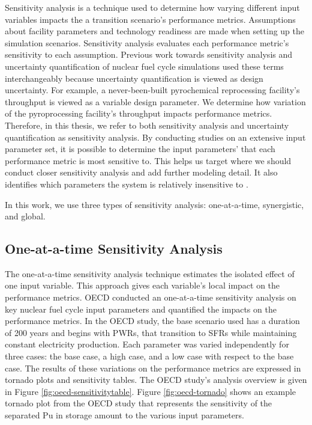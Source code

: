 Sensitivity analysis is a technique used to determine how varying
different input variables impacts the a transition scenario's performance metrics.
Assumptions about facility parameters and technology readiness 
are made when setting up the simulation scenarios. 
Sensitivity analysis evaluates each performance metric's 
sensitivity to each assumption. 
Previous work towards sensitivity analysis and uncertainty quantification of 
nuclear fuel cycle simulations used these terms interchangeably
because uncertainty quantification is viewed as design uncertainty.
For example, a never-been-built pyrochemical reprocessing 
facility's throughput is viewed as a variable design parameter.
We determine how variation of the pyroprocessing 
facility's throughput impacts performance metrics.
Therefore, in this thesis, we refer to both sensitivity analysis 
and uncertainty quantification as sensitivity analysis. 
By conducting studies on an extensive input parameter set, 
it is possible to determine the input parameters' that each performance 
metric is most sensitive to.
This helps us target where we should conduct closer 
sensitivity analysis and add further modeling detail.
It also identifies which parameters the system is relatively 
insensitive to \cite{noauthor_effects_2017}. 

In this work, we use three types of sensitivity analysis: 
one-at-a-time, synergistic, and global.

\subsection{One-at-a-time Sensitivity Analysis}
The one-at-a-time sensitivity analysis technique estimates 
the isolated effect of one input variable. 
This approach gives each variable's local impact 
on the performance metrics. 
\gls{OECD} conducted an one-at-a-time sensitivity analysis \cite{noauthor_effects_2017} 
on key nuclear fuel cycle input parameters
and quantified the impacts on the performance metrics. 
In the OECD study, the base scenario used has a duration of 200 years and begins 
with \glspl{PWR}, that transition to \glspl{SFR} while 
maintaining constant electricity production. 
Each parameter was varied independently for three cases: 
the base case, a high case, and a low case with respect to the base case. 
The results of these variations on the performance metrics 
are expressed in tornado plots and sensitivity tables. 
The OECD study's analysis overview is given in Figure \ref{fig:oecd-sensitivitytable}. 
Figure \ref{fig:oecd-tornado} shows an example tornado plot 
from the OECD study that represents 
the sensitivity of the separated Pu in storage amount to the 
various input parameters. 

